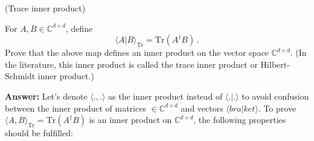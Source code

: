 \documentclass[12pt]{article}
\renewcommand{\>}{\rangle}
\newcommand{\<}{\langle}
\newcommand{\C}{\mathbb{C}}
\begin{document}
\newpage


 (Trace inner product)

\medskip
\noindent
For $A,B\in\C^{d\times d}$, define
\[
\< A | B\>_{\mathrm{Tr}} = \mathrm{Tr}(A^\dagger B)\,.
\]
Prove that the above map defines an inner product on the vector space $\C^{d\times d}$. (In the literature, this inner product is called the trace inner product or Hilbert-Schmidt inner product.) \newline

\textbf{Answer: } Let's denote $\< . , . \>$ as the inner product instead of $\< . | . \>$ to avoid confusion between the inner product of matrices $\in \C^{d\times d}$ and vectors $\< bra | ket \>$.
To prove $\< A , B\>_{\mathrm{Tr}} = \mathrm{Tr}(A^\dagger B)$ is an inner product on $\C^{d\times d}$, the following properties should be fulfilled:
\end{document}
